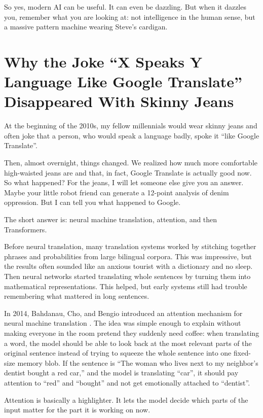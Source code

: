 \documentclass[12pt,oneside]{book}
\begin{document}
So yes, modern AI can be useful. It can even be dazzling. But when it dazzles you, remember what you are looking at: not intelligence in the human sense, but a massive pattern machine wearing Steve's cardigan.

\chapter{Why the Joke ``X Speaks Y Language Like Google Translate'' Disappeared With Skinny Jeans}

At the beginning of the 2010s, my fellow millennials would wear skinny jeans and often joke that a person, who would speak a language badly, spoke it ``like Google Translate''.

Then, almost overnight, things changed. We realized how much more comfortable high-waisted jeans are and that, in fact, Google Translate is actually good now. So what happened? For the jeans, I will let someone else give you an answer. Maybe your little robot friend can generate a 12-point analysis of denim oppression. But I can tell you what happened to Google.

The short answer is: neural machine translation, attention, and then Transformers.

Before neural translation, many translation systems worked by stitching together phrases and probabilities from large bilingual corpora. This was impressive, but the results often sounded like an anxious tourist with a dictionary and no sleep. Then neural networks started translating whole sentences by turning them into mathematical representations. This helped, but early systems still had trouble remembering what mattered in long sentences.

In 2014, Bahdanau, Cho, and Bengio introduced an attention mechanism for neural machine translation \parencite{bahdanau2015}. The idea was simple enough to explain without making everyone in the room pretend they suddenly need coffee: when translating a word, the model should be able to look back at the most relevant parts of the original sentence instead of trying to squeeze the whole sentence into one fixed-size memory blob. If the sentence is ``The woman who lives next to my neighbor's dentist bought a red car,'' and the model is translating ``car'', it should pay attention to ``red'' and ``bought'' and not get emotionally attached to ``dentist''.

Attention is basically a highlighter. It lets the model decide which parts of the input matter for the part it is working on now.
\end{document}

